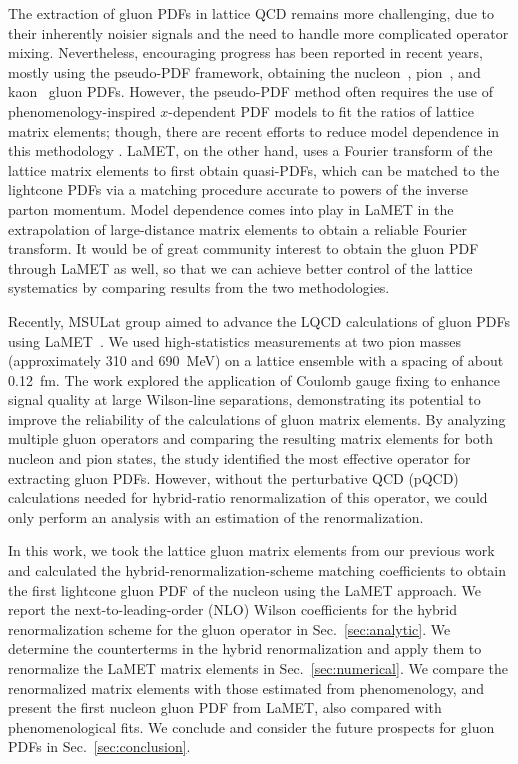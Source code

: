 The extraction of gluon PDFs in lattice QCD remains more challenging, due to their inherently noisier signals and the need to handle more complicated operator mixing.
Nevertheless, encouraging progress has been reported in recent years, mostly using the pseudo-PDF framework, obtaining the nucleon~\cite{Fan:2020cpa, Fan:2022kcb, HadStruc:2021wmh, Delmar:2023agv, HadStruc:2022yaw}, pion~\cite{Good:2023ecp}, and kaon~\cite{Salas-Chavira:2021wui} gluon PDFs.
However, the pseudo-PDF method often requires the use of phenomenology-inspired $x$-dependent PDF models to fit the ratios of lattice matrix elements; though, there are recent efforts to reduce model dependence in this methodology \cite{Karpie:2019eiq, Karpie:2021pap}.
LaMET, on the other hand, uses a Fourier transform of the lattice matrix elements to first obtain quasi-PDFs, which can be matched to the lightcone PDFs via a matching procedure accurate to powers of the inverse parton momentum.
Model dependence comes into play in LaMET in the extrapolation of large-distance matrix elements to obtain a reliable Fourier transform.
It would be of great community interest to obtain the gluon PDF through LaMET as well, so that we can achieve better control of the lattice systematics by comparing results from the two methodologies.

Recently, MSULat group aimed to advance the LQCD calculations of gluon PDFs using LaMET~\cite{Good:2024iur}.
We used high-statistics measurements at two pion masses (approximately 310 and 690~MeV) on a lattice ensemble with a spacing of about 0.12~fm.
The work explored the application of Coulomb gauge fixing to enhance signal quality at large Wilson-line separations, demonstrating its potential to improve the reliability of the calculations of gluon matrix elements.
By analyzing multiple gluon operators and comparing the resulting matrix elements for both nucleon and pion states, the study identified the most effective operator for extracting gluon PDFs.
However, without the perturbative QCD (pQCD) calculations needed for hybrid-ratio renormalization of this operator, we could only perform an analysis with an estimation of the renormalization.

In this work, we took the lattice gluon matrix elements from our previous work~\cite{Good:2024iur} and calculated the hybrid-renormalization-scheme matching coefficients to obtain the first lightcone gluon PDF of the nucleon using the LaMET approach.
We report the next-to-leading-order (NLO) Wilson coefficients for the hybrid renormalization scheme for the gluon operator in Sec.~\ref{sec:analytic}.
We determine the counterterms in the hybrid renormalization and apply them to renormalize the LaMET matrix elements in Sec.~\ref{sec:numerical}.
We compare the renormalized matrix elements with those estimated from phenomenology, and present the first nucleon gluon PDF from LaMET, also compared with phenomenological fits.
We conclude and consider the future prospects for gluon PDFs in Sec.~\ref{sec:conclusion}.

